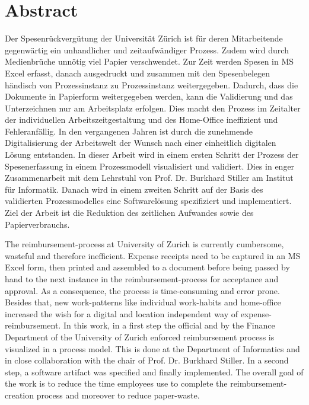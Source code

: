 \chapter*{Abstract}


Der Spesenrückvergütung der Universität Zürich ist für deren Mitarbeitende gegenwärtig ein unhandlicher und zeitaufwändiger Prozess. Zudem wird durch Medienbrüche unnötig viel Papier verschwendet. Zur Zeit werden Spesen in MS Excel erfasst, danach ausgedruckt und zusammen mit den Spesenbelegen händisch von Prozessinstanz zu Prozessinstanz weitergegeben. Dadurch, dass die Dokumente in Papierform weitergegeben werden, kann die Validierung und das Unterzeichnen nur am Arbeitsplatz erfolgen. Dies macht den Prozess im Zeitalter der individuellen Arbeitszeitgestaltung und des Home-Office ineffizient und Fehleranfällig. In den vergangenen Jahren ist durch die zunehmende Digitalisierung der Arbeitswelt der Wunsch nach einer einheitlich digitalen Lösung entstanden. In dieser Arbeit wird in einem ersten Schritt der Prozess der Spesenerfassung in einem Prozessmodell visualisiert und validiert. Dies in enger Zusammenarbeit mit dem Lehrstuhl von Prof. Dr. Burkhard Stiller am Institut für Informatik. Danach wird in einem zweiten Schritt auf der Basis des validierten Prozessmodelles eine Softwarelösung spezifiziert und implementiert. Ziel der Arbeit ist die Reduktion des zeitlichen Aufwandes sowie des Papierverbrauchs.



The reimbursement-process at University of Zurich is currently cumbersome, wasteful and therefore inefficient. Expense receipts need to be captured in an MS Excel form, then printed and assembled to a document before being passed by hand to the next instance in the reimbursement-process for acceptance and approval. As a consequence, the process is time-consuming and error prone. Besides that, new work-patterns like individual work-habits and home-office increased the wish for a digital and location independent way of expense-reimbursement. In this work, in a first step the official and by the Finance Department of the University of Zurich enforced reimbursement process is visualized in a process model. This is done at the Department of Informatics and in close collaboration with the chair of Prof. Dr. Burkhard Stiller. In a second step, a software artifact was specified and finally implemented. The overall goal of the work is to reduce the time employees use to complete the reimbursement-creation process and moreover to reduce paper-waste.
